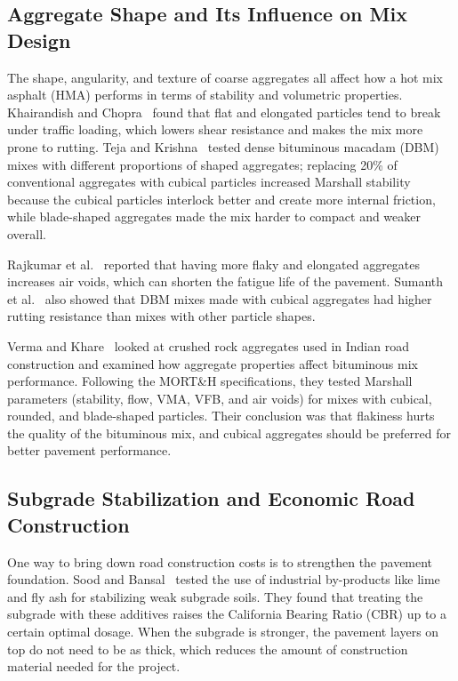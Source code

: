 \documentclass[12pt,a4paper]{article}
\begin{document}
\subsection{Aggregate Shape and Its Influence on Mix Design}
The shape, angularity, and texture of coarse aggregates all affect how a hot mix asphalt (HMA) performs in terms of stability and volumetric properties. Khairandish and Chopra~\cite{khairandish2020influence} found that flat and elongated particles tend to break under traffic loading, which lowers shear resistance and makes the mix more prone to rutting. Teja and Krishna~\cite{teja2020effect} tested dense bituminous macadam (DBM) mixes with different proportions of shaped aggregates; replacing 20\% of conventional aggregates with cubical particles increased Marshall stability because the cubical particles interlock better and create more internal friction, while blade-shaped aggregates made the mix harder to compact and weaker overall.

Rajkumar et al.~\cite{rajkumar2018experimental} reported that having more flaky and elongated aggregates increases air voids, which can shorten the fatigue life of the pavement. Sumanth et al.~\cite{sumanth2017study} also showed that DBM mixes made with cubical aggregates had higher rutting resistance than mixes with other particle shapes.

Verma and Khare~\cite{verma2024study} looked at crushed rock aggregates used in Indian road construction and examined how aggregate properties affect bituminous mix performance. Following the MORT\&H specifications, they tested Marshall parameters (stability, flow, VMA, VFB, and air voids) for mixes with cubical, rounded, and blade-shaped particles. Their conclusion was that flakiness hurts the quality of the bituminous mix, and cubical aggregates should be preferred for better pavement performance.

\subsection{Subgrade Stabilization and Economic Road Construction}
One way to bring down road construction costs is to strengthen the pavement foundation. Sood and Bansal~\cite{sood2015evaluation} tested the use of industrial by-products like lime and fly ash for stabilizing weak subgrade soils. They found that treating the subgrade with these additives raises the California Bearing Ratio (CBR) up to a certain optimal dosage. When the subgrade is stronger, the pavement layers on top do not need to be as thick, which reduces the amount of construction material needed for the project.
\end{document}
